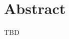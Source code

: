 \documentclass[a4paper,12pt,final]{include/intocpsassociation}   %
\newenvironment{assumption}{\noindent\smallskip\color{blue}\begin{framed}\begin{minipage}{0.95\columnwidth}}{\end{minipage}\end{framed}\smallskip\par}
\begin{document}
\maketitle
%
%
%
\section*{Abstract}
\label{sec:abstract}
%
TBD
%
\newpage
%
\tableofcontents
\newpage
%
%
%
%
%
%

\clearpage
%
%
%
%


\label{ch:bib} %
%
%
%
\clearpage
%
%
%
\appendix

\clearpage
%
%
%
\end{document}
